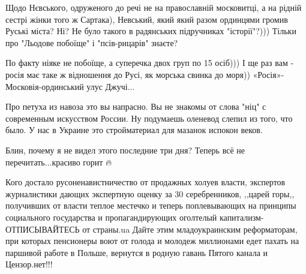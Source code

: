 \begin{itemize}
\begin{itemize}
Щодо Нєвського, одруженого до речі не на православній московитці, а на рідній
сестрі жінки того ж Сартака), Невський, який який разом ординцями громив Руські
міста? Ні? Не було такого в радянських підручниках "історії"?))) Тільки про
"Льодове побоїще" і "псів-рицарів" знаєте? 

По факту ніяке не побоїще, а суперечка двох груп по 15 осіб))) І ще раз вам -
росія має таке ж відношення до Русі, як морська свинка до моря))
«Росія»-Московія-ординський улус Джучі...

\end{itemize}

 
Про петуха из навоза это вы напрасно. Вы не знакомы от слова "ніц" с современным искусством России. Ну подумаешь оленевод слепил из того, что было. У нас в Украине это стройматериал для мазанок испокон веков.

 
Блин, почему я не видел этого последние три дня? Теперь всё не перечитать...красиво горит 🔥

 

Кого достало русоненавистничество от продажных холуев власти, экспертов
журналистики дающих экспертную оценку за 30 серебренников, ,,царей горы,,
получивших от власти теплое местечко и теперь поплевывающих на принципы
социального государства и пропагандирующих оголтелый капитализм- ОТПИСЫВАЙТЕСЬ
от страны.ua Дайте этим младоукраинским реформаторам, при которых пенсионеры
воют от голода и молодеж миллионами едет пахать на паршивой работе в Польше,
вернутся в родную гавань Пятого канала и Цензор.нет!!!

 

\end{itemize}
